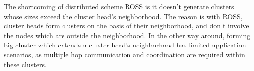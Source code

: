 \documentclass[10pt,journal,compsoc]{IEEEtran}
\theoremstyle{mytheoremstyle}
\theoremstyle{mytheoremstyle}
\theoremstyle{mytheoremstyle}
\begin{document}

The shortcoming of distributed scheme ROSS is it doesn't generate clusters whose sizes exceed the cluster head's neighborhood.
The reason is with ROSS, cluster heads form clusters on the basis of their neighborhood, and don't involve the nodes which are outside the neighborhood.
In the other way around, forming big cluster which extends a cluster head's neighborhood has limited application scenarios, as multiple hop communication and coordination are required within these clusters.









%


\appendices
\end{document}
